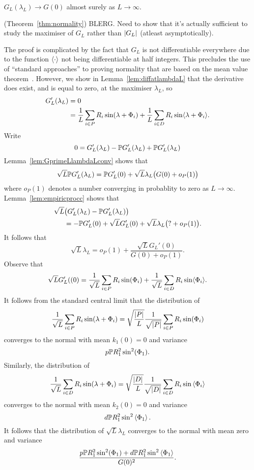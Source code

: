 \documentclass[journal]{IEEEtran}
\begin{document}
\begin{lemma}\label{lem:GLtoG0}
$G_L(\lambda_L) \rightarrow G(0)$ almost surely as $L \rightarrow \infty$.
\end{lemma}
\begin{IEEEproof}
\end{IEEEproof}
 
\begin{IEEEproof} (Theorem~\ref{thm:normality})
BLERG.  Need to show that it's actually sufficient to study the maximiser of $G_L$ rather than ${\left| G_L \right|}$ (atleast asymptotically).

The proof is complicated by the fact that $G_L$ is not differentiable everywhere due to the function $\left\langle \cdot \right\rangle$ not being differentiable at half integers.  This precludes the use of ``standard approaches'' to proving normality that are based on the mean value theorem~\cite{vonMises_diff_stats_1947,vanDerVart1971_asymptotic_stats,Pollard_new_ways_clts_1986,Pollard_conv_stat_proc_1984,Pollard_asymp_empi_proc_1989}.  However, we show in Lemma~\ref{lem:diffatlambdaL} that the derivative does exist, and is equal to zero, at the maximiser $\lambda_L$, so
\begin{align*}
G_L^\prime(\lambda_L) &= 0 \\
&= \frac{1}{L} \sum_{i \in P} R_i \sin(\lambda + \Phi_i) + \frac{1}{L} \sum_{i \in D} R_i \sin\langle \lambda + \Phi_i \rangle.
\end{align*}
Write
\[
0 = G_L^\prime(\lambda_L) - {\mathbb P} G_L^\prime(\lambda_L) + {\mathbb P} G_L^\prime(\lambda_L)
\]
Lemma~\ref{lem:GprimeLlambdaLconv} shows that
\[
\sqrt{L} {\mathbb P} G^\prime_L(\lambda_L) = {\mathbb P} G_L^\prime(0) + \sqrt{L} \lambda_L\big( G(0)  + o_P(1) \big)
\]
where $o_P(1)$ denotes a number converging in probablity to zero as $L \rightarrow \infty$.  Lemma~\ref{lem:empiricprocc} shows that
\begin{align*}
\sqrt{L}&\big( G_L^\prime(\lambda_L) - {\mathbb P} G_L^\prime(\lambda_L) \big) \\
&= -{\mathbb P} G_L^\prime(0) + \sqrt{L} G_L^\prime(0) + \sqrt{L}\lambda_L\big( ? +  o_P(1) \big).
\end{align*}
It follows that
\[
\sqrt{L} \lambda_L = o_P(1) + \frac{\sqrt{L}G_L'(0)}{G(0)  + o_P(1)}.
\]
Observe that 
\[
\sqrt{L} G_L^\prime((0) = \frac{1}{\sqrt{L}} \sum_{i \in P} R_i \sin(\Phi_i) + \frac{1}{\sqrt{L}} \sum_{i \in D} R_i \sin\langle \Phi_i \rangle.
\]
It follows from the standard central limit that the distribution of
\[
\frac{1}{\sqrt{L}} \sum_{i \in P} R_i \sin(\lambda + \Phi_i) = \sqrt{\frac{{\left| P \right|}}{L}} \frac{1}{\sqrt{{\left| P \right|}}} \sum_{i \in P} R_i \sin(\Phi_i) 
\]
converges to the normal with mean $k_1(0) = 0$ and variance 
\[
p {\mathbb P} R_1^2 \sin^2(\Phi_1).
\]
Similarly, the distribution of 
\[
\frac{1}{\sqrt{L}} \sum_{i \in D} R_i \sin(\lambda + \Phi_i) = \sqrt{\frac{{\left| D \right|}}{L}} \frac{1}{\sqrt{{\left| D \right|}}} \sum_{i \in D} R_i \sin\left\langle \Phi_i \right\rangle 
\]
converges to the normal with mean $k_2(0) = 0$ and variance
\[
d {\mathbb P} R_1^2 \sin^2\left\langle \Phi_1 \right\rangle.
\]
It follows that the distribution of $\sqrt{L}\lambda_L$ converges to the normal with mean zero and variance
\[
\frac{p {\mathbb P} R_1^2 \sin^2(\Phi_1) + d {\mathbb P} R_1^2 \sin^2\left\langle \Phi_1 \right\rangle}{G(0)^2}.
\]
\end{IEEEproof}
\end{document}

